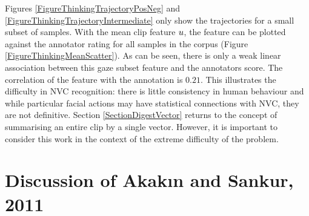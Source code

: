 Figures \ref{FigureThinkingTrajectoryPosNeg} and \ref{FigureThinkingTrajectoryIntermediate} only show the trajectories for a small subset of samples. With the mean clip feature $u$, the feature can be plotted against the annotator rating for all samples in the corpus (Figure \ref{FigureThinkingMeanScatter}). As can be seen, there is only a weak linear association between this gaze subset feature and the annotators score. The correlation of the feature with the annotation is $0.21$. This illustrates the difficulty in \ac{NVC} recognition: there is little consistency in human behaviour and while particular facial actions may have statistical connections with \ac{NVC}, they are not definitive. 
Section \ref{SectionDigestVector}  returns to the concept of summarising an entire clip by a single vector. However, it is important to consider this work in the context of the extreme difficulty of the problem.

\section{Discussion of Akak{\i}n and Sankur, 2011}
\label{SectionHmm}


